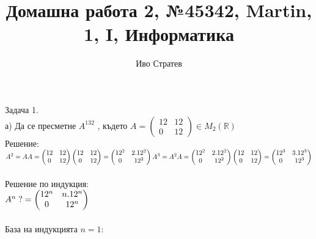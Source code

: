 \documentclass{article}
\title{Домашна работа 2, №45342, Martin, 1, I, Информатика}
\author{Иво Стратев}
\begin{document}
    \maketitle
    Задача 1.\\
    а) Да се пресметне \(A^{132}\) , където
    \(A =
    \begin{pmatrix}
        12 & 12\\
        0 & 12
    \end{pmatrix} \in M_2(\mathbb{R})\)\\
    Решение:\\
    \(\\A^2 = AA = \begin{pmatrix}
        12 & 12\\
        0 & 12
    \end{pmatrix}
    \begin{pmatrix}
        12 & 12\\
        0 & 12
    \end{pmatrix}
    = \begin{pmatrix}
        12^2 & 2.12^2\\
        0 & 12^2
    \end{pmatrix}\\
    \\
    \\
    A^3 = A^2A =\begin{pmatrix}
        12^2 & 2.12^2\\
        0 & 12^2
    \end{pmatrix}
    \begin{pmatrix}
        12 & 12\\
        0 & 12
    \end{pmatrix}
    = \begin{pmatrix}
        12^3 & 3.12^3\\
        0 & 12^3
    \end{pmatrix}\)\\
    \\ Решение по индукция:\\
    \(\\\\A^n \; ?= \begin{pmatrix}
        12^n & n.12^n\\
        0 & 12^n
    \end{pmatrix}\)\\
    \\ База на индукцията \(n = 1\):\\
\end{document}

